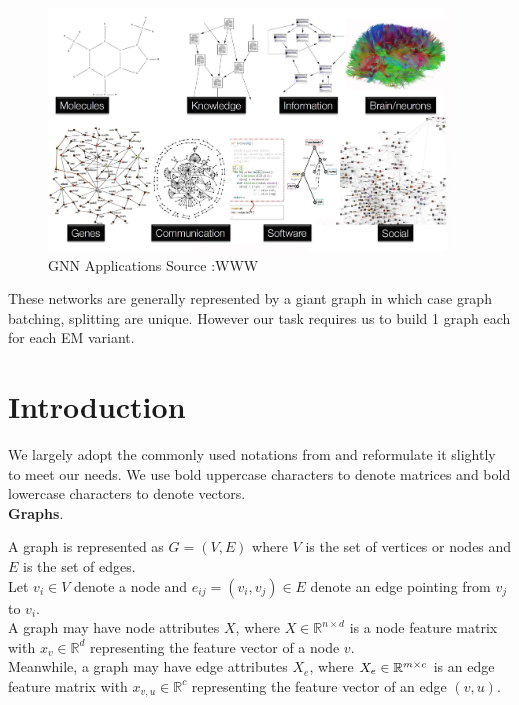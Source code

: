 \documentclass{report} %
\begin{document}
\begin{figure}[H]
    \centering
    \includegraphics[width=0.95\textwidth]{./ReportImages/GraphApplications.png} 
    \caption{\ac{GNN} Applications Source :WWW}
    \label{fig:GNN Applications}
\end{figure}

These networks are generally represented by a giant graph in which case graph batching, splitting are unique.
However our task requires us to build 1 graph each for each \ac{EM} variant.

\section{Introduction}\label{sec:Introduction}

We largely adopt the commonly used notations from \cite{GNN-2019} and reformulate it slightly to meet our needs.
We use bold uppercase characters to denote matrices and bold lowercase characters to denote vectors.\\

\textbf{Graphs}. 

A graph is represented as \( G = (V, E) \) where \( V \) is the set of vertices or nodes  and \( E \) is the set of edges. \\
Let \( v_i \in V \) denote a node and \( e_{ij} = (v_i, v_j) \in E \) denote an edge pointing from \( v_j \) to \( v_i \). \\
A graph may have node attributes \( X \), where \( X \in \mathbb{R}^{n \times d} \) is a node feature matrix with 
\( x_v \in \mathbb{R}^d \) representing the feature vector of a node \( v \). \\
Meanwhile, a graph may have edge attributes \( X_e \), where \( X_e \in \mathbb{R}^{m \times \\c} \) is an edge
feature matrix with \( x_{v,u} \in \mathbb{R}^c \) representing the feature vector of an edge \( (v, u) \).\\
\end{document}
